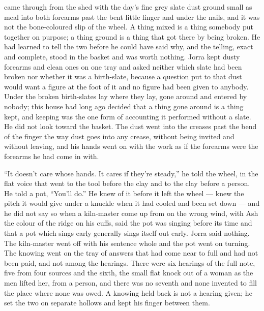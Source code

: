 \scenebreak

 came through from the shed with the day's fine grey slate dust ground small as meal into both forearms past the bent little finger and under the nails, and it was not the bone-coloured slip of the wheel. A thing mixed is a thing somebody put together on purpose; a thing ground is a thing that got there by being broken. He had learned to tell the two before he could have said why, and the telling, exact and complete, stood in the basket and was worth nothing. Jorra kept dusty forearms and clean ones on one tray and asked neither which slate had been broken nor whether it was a birth-slate, because a question put to that dust would want a figure at the foot of it and no figure had been given to anybody. Under  the broken birth-slates lay where they lay, gone around and entered by nobody; this house had long ago decided that a thing gone around is a thing kept, and keeping was the one form of accounting it performed without a slate. He did not look toward the basket. The dust went into the creases past the bend of the finger the way dust goes into any crease, without being invited and without leaving, and his hands went on with the work as if the forearms were the forearms he had come in with.

“It doesn't care whose hands. It cares if they're steady,” he told the wheel, in the flat voice that went to the tool before the clay and to the clay before a person. He told a pot, “You'll do.” He knew  of it before it left the wheel --- knew the pitch it would give under a knuckle when it had cooled and been set down --- and he did not say so when a kiln-master come up from  on the wrong wind, with Ash the colour of the ridge on his cuffs, said the pot was singing before its time and that a pot which sings early generally sings itself out early. Jorra said nothing. The kiln-master went off with his sentence whole and the pot went on turning. The knowing went on the tray of answers that had come near to full and had not been paid, and not among the hearings. There were six hearings of the full note, five from four sources and the sixth, the small flat knock out of a woman as the men lifted her, from a person, and there was no seventh and none invented to fill the place where none was owed. A knowing held back is not a hearing given; he set the two on separate hollows and kept his finger between them.


